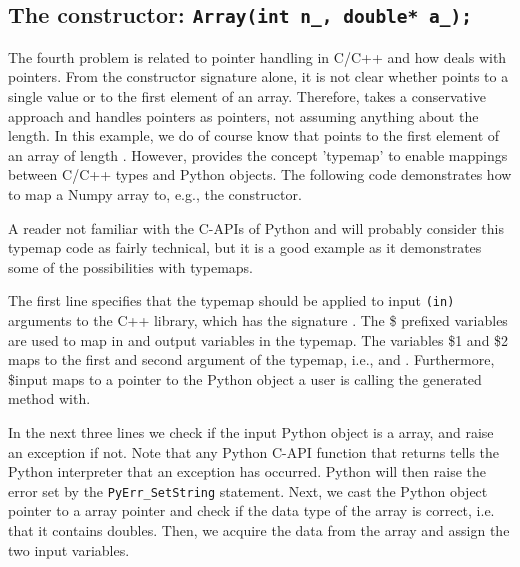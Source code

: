 \begin{code}
\subsection{The constructor: \texttt{Array(int n\_, double* a\_);}}
The fourth problem is related to pointer handling in C/C++ and how \swig deals with pointers.  From the constructor signature alone, it is not clear whether  points to a single value or to the first element of an array.
Therefore, \swig takes a conservative approach and handles pointers as pointers, not assuming anything about the length.
In this example, we do of course know that
 points to the first element of an array of length .
However, \swig provides the concept 'typemap' to enable mappings between C/C++ types and Python objects.
The following code demonstrates how to map a Numpy array
to, e.g., the  constructor.
A reader not familiar with the C-APIs of Python and \numpy will probably consider this typemap code as fairly technical, but it is a good example as it demonstrates some of the possibilities with typemaps. \par
The first line specifies that the typemap should be applied to input \texttt{(in)} arguments to the C++ library, which has the signature . The \$ prefixed variables are used to map in and output variables in the typemap. The variables \$1 and \$2 maps to the first and second argument of the typemap, i.e.,  and . Furthermore, \$input maps to a pointer to the Python object a user is calling the \swig generated method with. \par
In the next three lines we check if the input Python object is a \numpy array, and raise an exception if not.
Note that any Python C-API function that returns  tells the Python interpreter that an exception has occurred. Python will then raise the error set by the \texttt{PyErr\_SetString} statement. Next, we cast the Python object pointer to a \numpy array pointer and check if the data type of the \numpy array is correct, i.e. that it contains doubles. Then, we acquire the data from the \numpy array and assign the two input variables.\par


\end{code}
